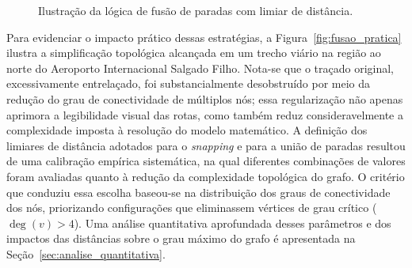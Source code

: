 \documentclass[cic,tc]{infufrgs}
\begin{document}
\begin{figure}[H]
    \centering
    \vspace{0.5cm}
    \caption{Ilustração da lógica de fusão de paradas com limiar de distância.}
    \label{fig:fusao_paradas_logica}
\end{figure}

Para evidenciar o impacto prático dessas estratégias, a Figura~\ref{fig:fusao_pratica} ilustra a simplificação topológica alcançada em um trecho viário na região ao norte do Aeroporto Internacional Salgado Filho. Nota-se que o traçado original, excessivamente entrelaçado, foi substancialmente desobstruído por meio da redução do grau de conectividade de múltiplos nós; essa regularização não apenas aprimora a legibilidade visual das rotas, como também reduz consideravelmente a complexidade imposta à resolução do modelo matemático. A definição dos limiares de distância adotados para o \textit{snapping} e para a união de paradas resultou de uma calibração empírica sistemática, na qual diferentes combinações de valores foram avaliadas quanto à redução da complexidade topológica do grafo. O critério que conduziu essa escolha baseou-se na distribuição dos graus de conectividade dos nós, priorizando configurações que eliminassem vértices de grau crítico ($\deg(v) > 4$). Uma análise quantitativa aprofundada desses parâmetros e dos impactos das distâncias sobre o grau máximo do grafo é apresentada na Seção~\ref{sec:analise_quantitativa}.
\end{document}

